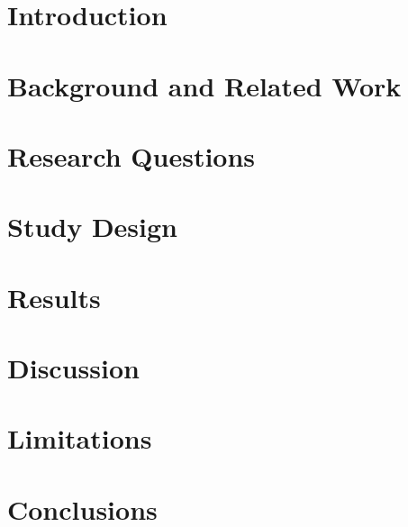 \documentclass{sig-alternate}
\begin{document}


\section{Introduction}

\section{Background and Related Work}

\section{Research Questions}

\section{Study Design}



\section{Results}

\section{Discussion}

\section{Limitations}

\section{Conclusions}



\end{document}

